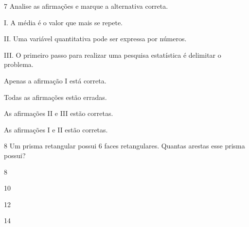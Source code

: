 



\num{7} Analise as afirmações e marque a alternativa correta.

I. A média é o valor que mais se repete.

II. Uma variável quantitativa pode ser expressa por números.

III. O primeiro passo para realizar uma pesquisa estatística é
delimitar o problema.


\begin{escolha}
\item Apenas a afirmação I está correta.
\item Todas as afirmações estão erradas.
\item As afirmações II e III estão corretas.
\item As afirmações I e II estão corretas.
\end{escolha}






\num{8} Um prisma retangular possui 6 faces retangulares. Quantas arestas
esse prisma possui?

\begin{multicols}{2}
\begin{escolha}
\item 8
\item 10
\item 12
\item 14
\end{escolha}
\end{multicols}

